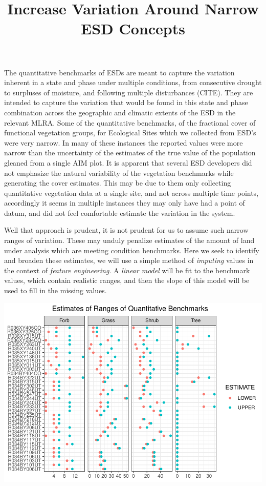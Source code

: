 \documentclass[
]{article}
\title{Increase Variation Around Narrow ESD Concepts}
\author{}
\date{\vspace{-2.5em}}
\begin{document}
\maketitle

The quantitative benchmarks of ESDs are meant to capture the variation
inherent in a state and phase under multiple conditions, from
consecutive drought to surpluses of moisture, and following multiple
disturbances (CITE). They are intended to capture the variation that
would be found in this state and phase combination across the geographic
and climatic extents of the ESD in the relevant MLRA. Some of the
quantitative benchmarks, of the fractional cover of functional
vegetation groups, for Ecological Sites which we collected from ESD's
were very narrow. In many of these instances the reported values were
more narrow than the uncertainty of the estimates of the true value of
the population gleaned from a single AIM plot. It is apparent that
several ESD developers did not emphasize the natural variability of the
vegetation benchmarks while generating the cover estimates. This may be
due to them only collecting quantitative vegetation data at a single
site, and not across multiple time points, accordingly it seems in
multiple instances they may only have had a point of datum, and did not
feel comfortable estimate the variation in the system.

Well that approach is prudent, it is not prudent for us to assume such
narrow ranges of variation. These may unduly penalize estimates of the
amount of land under analysis which are meeting condition benchmarks.
Here we seek to identify and broaden these estimates, we will use a
simple method of \emph{imputing} values in the context of \emph{feature
engineering}. A \emph{linear model} will be fit to the benchmark values,
which contain realistic ranges, and then the slope of this model will be
used to fill in the missing values.

\includegraphics{increase_range_around_narrow_means_files/figure-latex/Plot Initial variation-1.pdf}
\end{document}
